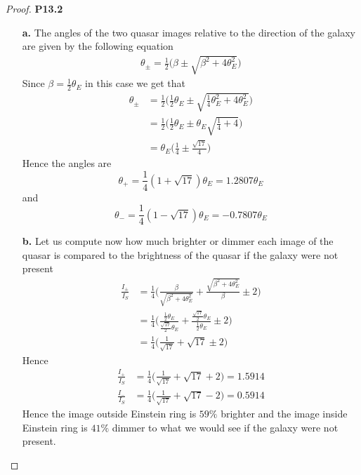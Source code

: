 \documentclass[11pt]{article}
\theoremstyle{definition}
\begin{document}
\cleardoublepage
\begin{proof}{\textbf{P13.2}}
\begin{itemize}
\item [\textbf{a.}] The angles of the two quasar images relative to the
direction of the galaxy are given by the following equation
\begin{align*}
    \theta_{\pm} = \frac{1}{2}\bigg(\beta \pm \sqrt{\beta^2 + 4\theta_E^2}\bigg)
\end{align*}
Since $\beta = \frac{1}{2}\theta_E$ in this case we get that
\begin{align*}
    \theta_{\pm}
    &= \frac{1}{2}\bigg(\frac{1}{2}\theta_E \pm \sqrt{\frac{1}{4}\theta_E^2 + 4\theta_E^2}\bigg)\\
    &= \frac{1}{2}\bigg(\frac{1}{2}\theta_E \pm \theta_E\sqrt{\frac{1}{4} + 4}\bigg)\\
    &= \theta_E\bigg(\frac{1}{4} \pm \frac{\sqrt{17}}{4}\bigg)
\end{align*}
Hence the angles are 
$$\theta_+ = \frac{1}{4}(1 + \sqrt{17})\theta_E = 1.2807 \theta_E$$
and
$$\theta_- = \frac{1}{4}(1 - \sqrt{17})\theta_E = -0.7807 \theta_E$$
\item [\textbf{b.}] Let us compute now how much brighter or dimmer each
image of the quasar is compared to the brightness of the quasar if the galaxy were
not present
\begin{align*}
    \frac{I_{\pm}}{I_S}
    &= \frac{1}{4}\bigg(\frac{\beta}{\sqrt{\beta^2 + 4\theta_E^2}}
    + \frac{\sqrt{\beta^2 + 4\theta_E^2}}{\beta} \pm 2\bigg)\\
    &= \frac{1}{4}\bigg(\frac{\frac{1}{2}\theta_E}{\frac{\sqrt{17}}{2}\theta_E}
    + \frac{\frac{\sqrt{17}}{2}\theta_E}{\frac{1}{2}\theta_E} \pm 2\bigg)\\
    &= \frac{1}{4}\bigg(\frac{1}{\sqrt{17}} + \sqrt{17} \pm 2\bigg)
\end{align*}
Hence
\begin{align*}
    \frac{I_{+}}{I_S}
    &= \frac{1}{4}\bigg(\frac{1}{\sqrt{17}} + \sqrt{17} + 2\bigg)
    = 1.5914\\[11pt]
    \frac{I_{-}}{I_S}
    &= \frac{1}{4}\bigg(\frac{1}{\sqrt{17}} + \sqrt{17} - 2\bigg)
    = 0.5914
\end{align*}
Hence the image outside Einstein ring is $59\%$ brighter and the image inside
Einstein ring is $41\%$ dimmer to what we would see if the galaxy were not
present.
\end{itemize}
\end{proof}
\end{document}
